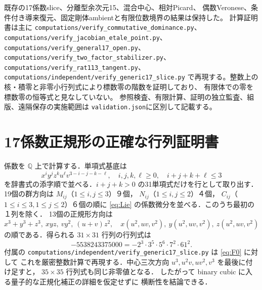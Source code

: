 \documentclass[11pt,a4paper]{ltjsarticle}
\numberwithin{equation}{section}
\begin{document}
既存の17係数slice、分離型余次元15、混合中心、相対Picard、
偶数Veronese、条件付き導来復元、固定剛体ambientと有限位数境界の結果は保持した。
計算証明書は主に
\nolinkurl{computations/verify_commutative_dominance.py}、
\nolinkurl{computations/verify_jacobian_etale_point.py}、
\nolinkurl{computations/verify_general17_open.py}、
\nolinkurl{computations/verify_two_factor_stabilizer.py}、
\nolinkurl{computations/verify_rat113_tangent.py}、
\nolinkurl{computations/independent/verify_generic17_slice.py}
で再現する。整数上の核・積零と非零小行列式により標数零の階数を証明しており、
有限体での零を標数零の恒等式と見なしていない。
参照検査、有限計算、証明の独立監査、組版、遠隔保存の実施範囲は
\nolinkurl{validation.json}に区別して記載する。

\appendix
\section{17係数正規形の正確な行列証明書}\label{app:rank}
係数を $\mathbb Q$ 上で計算する．単項式基底は
\[
 x^iy^jz^ku^\ell v^{3-i-j-k-\ell},\quad
 i,j,k,\ell\ge0,\quad i+j+k+\ell\le3
\]
を辞書式の添字順で並べる．$i+j+k>0$ の31単項式だけを行として取り出す．
19個の群方向は $M_{ij}$（$1\le i,j\le3$）９個，
$N_{ij}$（$1\le i,j\le2$）４個，
$C_{ij}$（$1\le i\le3,1\le j\le2$）６個の順に
\eqref{eq:Lie} の係数微分を並べる．このうち最初の１列を除く．
13個の正規形方向は
\[
 x^3+y^3+z^3,\ xyz,\ vy^2,\ (u+v)z^2,\quad
 x(u^2,uv,v^2),\ y(u^2,uv,v^2),\ z(u^2,uv,v^2)
\]
の順である．得られる $31\times31$ 行列の行列式は
\[
 -5538243375000=-2^3\cdot3^5\cdot5^6\cdot7^2\cdot61^2.
\]
付属の \nolinkurl{computations/independent/verify_generic17_slice.py} は \eqref{eq:F0} に対して
これを厳密整数計算で再現する．中心三次方向
$u^3,u^2v,uv^2,v^3$ を最後に付け足すと，
$35\times35$ 行列式も同じ非零値となる．
したがって binary cubic に入る量子的な正規化補正の詳細を仮定せずに
横断性を結論できる．
\end{document}
